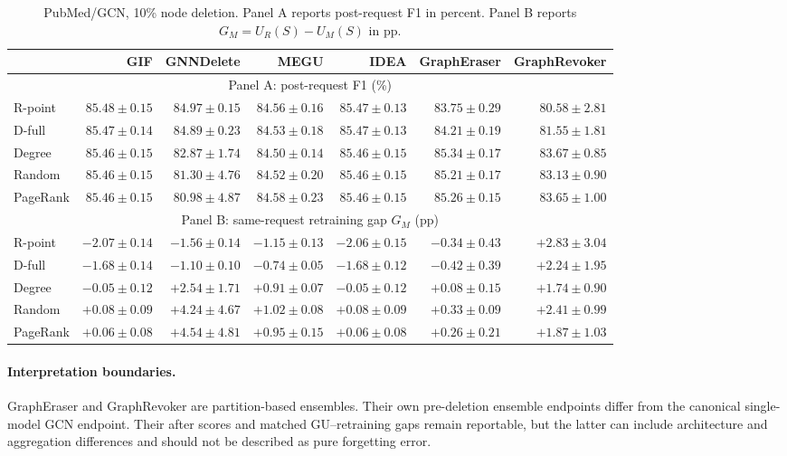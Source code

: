 \begin{table}[t]
\centering
\scriptsize
\setlength{\tabcolsep}{4pt}
\caption{PubMed/GCN, 10\% node deletion. Panel A reports post-request F1 in percent. Panel B reports $G_M=U_R(S)-U_M(S)$ in pp.}
\label{tab:pubmed-full}
\begin{tabular}{lrrrrrr}
\toprule
 & GIF & GNNDelete & MEGU & IDEA & GraphEraser & GraphRevoker \\
\midrule
\multicolumn{7}{c}{Panel A: post-request F1 (\%)} \\
\midrule
R-point & $85.48\pm0.15$ & $84.97\pm0.15$ & $84.56\pm0.16$ & $85.47\pm0.13$ & $83.75\pm0.29$ & $80.58\pm2.81$ \\
D-full & $85.47\pm0.14$ & $84.89\pm0.23$ & $84.53\pm0.18$ & $85.47\pm0.13$ & $84.21\pm0.19$ & $81.55\pm1.81$ \\
Degree & $85.46\pm0.15$ & $82.87\pm1.74$ & $84.50\pm0.14$ & $85.46\pm0.15$ & $85.34\pm0.17$ & $83.67\pm0.85$ \\
Random & $85.46\pm0.15$ & $81.30\pm4.76$ & $84.52\pm0.20$ & $85.46\pm0.15$ & $85.21\pm0.17$ & $83.13\pm0.90$ \\
PageRank & $85.46\pm0.15$ & $80.98\pm4.87$ & $84.58\pm0.23$ & $85.46\pm0.15$ & $85.26\pm0.15$ & $83.65\pm1.00$ \\
\midrule
\multicolumn{7}{c}{Panel B: same-request retraining gap $G_M$ (pp)} \\
\midrule
R-point & $-2.07\pm0.14$ & $-1.56\pm0.14$ & $-1.15\pm0.13$ & $-2.06\pm0.15$ & $-0.34\pm0.43$ & $+2.83\pm3.04$ \\
D-full & $-1.68\pm0.14$ & $-1.10\pm0.10$ & $-0.74\pm0.05$ & $-1.68\pm0.12$ & $-0.42\pm0.39$ & $+2.24\pm1.95$ \\
Degree & $-0.05\pm0.12$ & $+2.54\pm1.71$ & $+0.91\pm0.07$ & $-0.05\pm0.12$ & $+0.08\pm0.15$ & $+1.74\pm0.90$ \\
Random & $+0.08\pm0.09$ & $+4.24\pm4.67$ & $+1.02\pm0.08$ & $+0.08\pm0.09$ & $+0.33\pm0.09$ & $+2.41\pm0.99$ \\
PageRank & $+0.06\pm0.08$ & $+4.54\pm4.81$ & $+0.95\pm0.15$ & $+0.06\pm0.08$ & $+0.26\pm0.21$ & $+1.87\pm1.03$ \\
\bottomrule
\end{tabular}
\end{table}

\paragraph{Interpretation boundaries.}
GraphEraser and GraphRevoker are partition-based ensembles. Their own pre-deletion ensemble endpoints differ from the canonical single-model GCN endpoint. Their after scores and matched GU--retraining gaps remain reportable, but the latter can include architecture and aggregation differences and should not be described as pure forgetting error.


